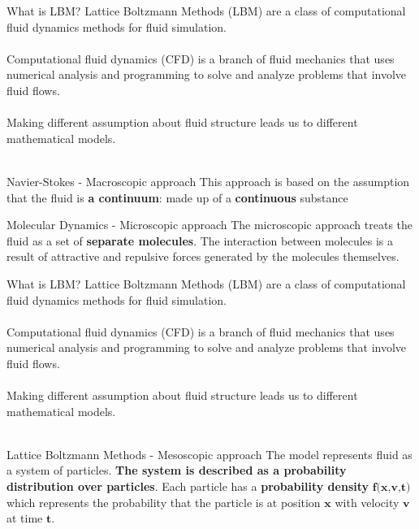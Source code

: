 \documentclass[9pt]{beamer}
\begin{document}
\begin{frame}[t]{What is LBM?}
Lattice Boltzmann Methods (LBM) are a class of computational fluid dynamics methods for fluid simulation. \cite{lattice_boltzmann_wiki} \\~\\


Computational fluid dynamics (CFD) is a branch of fluid mechanics that uses numerical analysis and programming to solve and analyze problems that involve fluid flows. \\~\\

Making different assumption about fluid structure leads us to different mathematical models. \\~\\

\begin{block}{Navier-Stokes - Macroscopic approach}
This approach is based on the assumption that the fluid is \textbf{a continuum}: made up of a \textbf{continuous} substance
\end{block}

\begin{block}{Molecular Dynamics - Microscopic approach}
The microscopic approach treats the fluid as a set of \textbf{separate molecules}. The interaction between molecules is a result of attractive and repulsive forces generated by the molecules themselves.
\end{block}

\end{frame}

\begin{frame}[t]{What is LBM?}
Lattice Boltzmann Methods (LBM) are a class of computational fluid dynamics methods for fluid simulation. \\~\\


Computational fluid dynamics (CFD) is a branch of fluid mechanics that uses numerical analysis and programming to solve and analyze problems that involve fluid flows. \\~\\

Making different assumption about fluid structure leads us to different mathematical models. \\~\\

\begin{alertblock}{Lattice Boltzmann Methods - Mesoscopic approach}
The model represents fluid as a system of particles. \textbf{The system is described as a probability distribution over particles}. Each particle has a \textbf{probability density} $\textbf{f(x,v,t)}$ which represents the probability that the particle is at position $\textbf{x}$ with velocity $\textbf{v}$ at time $\textbf{t}.$ 
\end{alertblock}

\end{frame}
\end{document}
